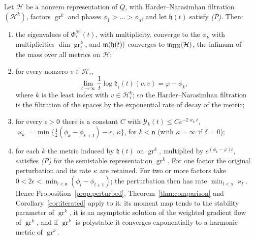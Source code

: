 \begin{theorem}\label{thm:hn}
Let $\mathcal H$ be a nonzero representation of $Q$, with
Harder--Narasimhan filtration $(\mathcal H^k)$, factors
$\operatorname{gr}^k$ and phases $\phi_1>\dots>\phi_{\mathsf n}$, and let
$\mathfrak h(t)$ satisfy \emph{(P)}. Then:
\begin{enumerate}
\item[(i)] the eigenvalues of $\Phi^{\mathcal H}_i(t)$, with multiplicity,
 converge to the $\phi_k$ with multiplicities
 $\dim\operatorname{gr}^k_i$, and $\mathfrak m(\mathfrak h(t))$ converges to
 $\mathfrak m_{\mathrm{HN}}(\mathcal H)$, the infimum of the mass over all metrics
 on $\mathcal H$;
\item[(ii)] for every nonzero $v\in\mathcal H_i$,
 \[
 \lim_{t\to\infty}\frac1t\log\mathfrak h_i(t)(v,v)=\varphi-\phi_k,
 \]
 where $k$ is the least index with $v\in\mathcal H^k_i$; so the
 Harder--Narasimhan filtration is the filtration of the spaces by the
 exponential rate of decay of the metric;
\item[(iii)] for every $\epsilon>0$ there is a constant $C$ with
 $\mathcal Y_k(t)\leq Ce^{-2\varkappa_kt}$,
 $\varkappa_k=\min\{\frac12(\phi_k-\phi_{k+1})-\epsilon,\ \kappa\}$, for
 $k<\mathsf n$ (with $\kappa=\infty$ if $\delta=0$);
\item[(iv)] for each $k$ the metric induced by $\mathfrak h(t)$ on
 $\operatorname{gr}^k$, multiplied by $e^{(\phi_k-\varphi)t}$, satisfies
 \emph{(P)} for the semistable representation $\operatorname{gr}^k$. For one
 factor the original perturbation and its rate $\kappa$ are retained.
 For two or more factors take $0<2\epsilon<\min_{l<\mathsf n}(\phi_l-\phi_{l+1})$;
 the perturbation then has rate $\min_{l<\mathsf n}\varkappa_l$. Hence
 Proposition~\ref{prop:perturbed}, Theorem~\ref{thm:comparison} and
 Corollary~\ref{cor:iterated} apply to it: its moment map tends to the
 stability parameter of $\operatorname{gr}^k$, it is an asymptotic solution
 of the weighted gradient flow of $\operatorname{gr}^k$, and if
 $\operatorname{gr}^k$ is polystable it converges exponentially to a
 harmonic metric of $\operatorname{gr}^k$.
\end{enumerate}
\end{theorem}

